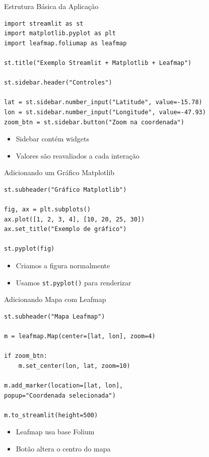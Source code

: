 \documentclass{beamer}
\begin{document}
\begin{frame}[fragile]{Estrutura Básica da Aplicação}
    \begin{verbatim}
import streamlit as st
import matplotlib.pyplot as plt
import leafmap.foliumap as leafmap

st.title("Exemplo Streamlit + Matplotlib + Leafmap")

st.sidebar.header("Controles")

lat = st.sidebar.number_input("Latitude", value=-15.78)
lon = st.sidebar.number_input("Longitude", value=-47.93)
zoom_btn = st.sidebar.button("Zoom na coordenada")
    \end{verbatim}
    
    \begin{itemize}
        \item Sidebar contém widgets
        \item Valores são reavaliados a cada interação
    \end{itemize}
\end{frame}

\begin{frame}[fragile]{Adicionando um Gráfico Matplotlib}
    \begin{verbatim}
st.subheader("Gráfico Matplotlib")

fig, ax = plt.subplots()
ax.plot([1, 2, 3, 4], [10, 20, 25, 30])
ax.set_title("Exemplo de gráfico")

st.pyplot(fig)
    \end{verbatim}
    
    \begin{itemize}
        \item Criamos a figura normalmente
        \item Usamos \texttt{st.pyplot()} para renderizar
    \end{itemize}
\end{frame}

\begin{frame}[fragile]{Adicionando Mapa com Leafmap}
    \begin{verbatim}
st.subheader("Mapa Leafmap")

m = leafmap.Map(center=[lat, lon], zoom=4)

if zoom_btn:
    m.set_center(lon, lat, zoom=10)

m.add_marker(location=[lat, lon],
popup="Coordenada selecionada")

m.to_streamlit(height=500)
    \end{verbatim}
    
    \begin{itemize}
        \item Leafmap usa base Folium
        \item Botão altera o centro do mapa
    \end{itemize}
\end{frame}
\end{document}
